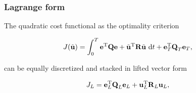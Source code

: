 
\subsubsection{Lagrange form} The quadratic cost functional as the optimality criterion

\begin{equation}
\begin{aligned}
J(\tilde{\boldsymbol{\mathrm{u}}}) &= \int_{0}^{T} \boldsymbol{\mathrm{e}}^{\mathrm{T}}\boldsymbol{\mathrm{Q}}\boldsymbol{\mathrm{e}} + \tilde{\boldsymbol{\mathrm{u}}}^{\mathrm{T}}\boldsymbol{\mathrm{R}}\tilde{\boldsymbol{\mathrm{u}}} \ \mathrm{d}t + \boldsymbol{\mathrm{e}}_{T}^{\mathrm{T}}\boldsymbol{\mathrm{Q}}_{T}\boldsymbol{\mathrm{e}}_{T},
\end{aligned}
\label{cost}
\end{equation}

\noindent can be equally discretized and stacked in lifted vector form

\begin{equation}
\begin{aligned}
J_L &= \boldsymbol{\mathrm{e}}_L^{\mathrm{T}}\boldsymbol{\mathrm{Q}}_L\boldsymbol{\mathrm{e}}_L + \boldsymbol{\mathrm{u}}_L^{\mathrm{T}}\boldsymbol{\mathrm{R}}_L\boldsymbol{\mathrm{u}}_L,
\end{aligned}
\label{costFunctional}
\end{equation}


